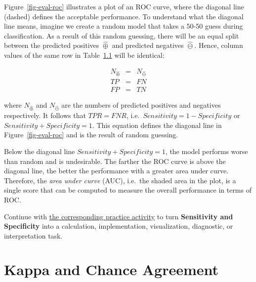 \documentclass[
  letterpaper,
]{scrbook}
\begin{document}
Figure~\ref{fig-eval-roc} illustrates a plot of an ROC curve, where the
diagonal line (dashed) defines the acceptable performance. To understand
what the diagonal line means, imagine we create a random model that
takes a 50-50 guess during classification. As a result of this random
guessing, there will be an equal split between the predicted positives
\(\hat{\oplus}\) and predicted negatives \(\hat{\ominus}\). Hence,
column values of the same row in Table~\hyperref[tab-eval-cmatrix]{1.1}
will be identical:

\[\begin{aligned}
  N_{\hat{\oplus}} & = & N_{\hat{\ominus}} \\
  TP & = & FN \\
  FP & = & TN
\end{aligned}\]

where \(N_{\hat{\oplus}}\) and \(N_{\hat{\ominus}}\) are the numbers of
predicted positives and negatives respectively. It follows that
\(TPR = FNR\), i.e.~\(Sensitivity = 1 - Specificity\) or
\(Sensitivity + Specificity=1\). This equation defines the diagonal line
in Figure~\ref{fig-eval-roc} and is the result of random guessing.

Below the diagonal line \(Sensitivity+Specificity=1\), the model
performs worse than random and is undesirable. The farther the ROC curve
is above the diagonal line, the better the performance with a greater
area under curve. Therefore, the \emph{area under curve} (AUC), i.e.~the
shaded area in the plot, is a single score that can be computed to
measure the overall performance in terms of ROC.

\begin{tcolorbox}[enhanced jigsaw, arc=.35mm, bottomrule=.15mm, bottomtitle=1mm, breakable, colback=white, colbacktitle=quarto-callout-tip-color!10!white, colframe=quarto-callout-tip-color-frame, coltitle=black, left=2mm, leftrule=.75mm, opacityback=0, opacitybacktitle=0.6, rightrule=.15mm, title=\textcolor{quarto-callout-tip-color}{\faLightbulb}\hspace{0.5em}{Put it into practice}, titlerule=0mm, toprule=.15mm, toptitle=1mm]

Continue with \hyperref[sec-pr-14-sensitivity-and-specificity]{the
corresponding practice activity} to turn \textbf{Sensitivity and
Specificity} into a calculation, implementation, visualization,
diagnostic, or interpretation task.

\end{tcolorbox}

\section{Kappa and Chance Agreement}\label{kappa-and-chance-agreement}
\end{document}
